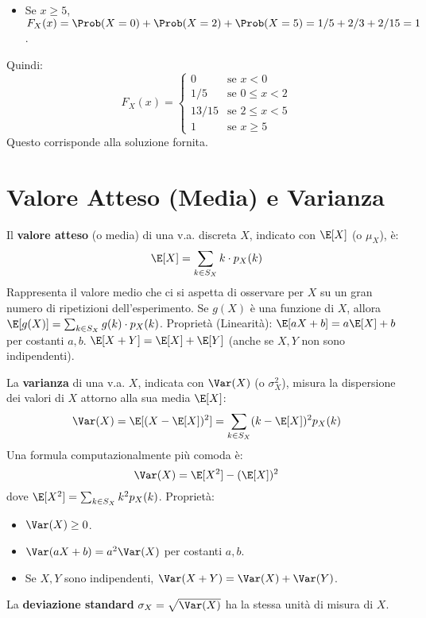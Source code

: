 \begin{example}
\begin{enumerate}
\begin{itemize}
        \item Se $x \ge 5$, $F_X(x) = \Prob(X=0) + \Prob(X=2) + \Prob(X=5) = 1/5 + 2/3 + 2/15 = 1$.
    \end{itemize}
    Quindi:
    \[ F_X(x) = \begin{cases} 0 & \text{se } x < 0 \\ 1/5 & \text{se } 0 \le x < 2 \\ 13/15 & \text{se } 2 \le x < 5 \\ 1 & \text{se } x \ge 5 \end{cases} \]
    Questo corrisponde alla soluzione fornita.
\end{enumerate}
\end{example}

\section{Valore Atteso (Media) e Varianza}
\begin{definition}
Il \textbf{valore atteso} (o media) di una v.a. discreta $X$, indicato con $\E[X]$ (o $\mu_X$), è:
\[ \E[X] = \sum_{k \in S_X} k \cdot p_X(k) \]
Rappresenta il valore medio che ci si aspetta di osservare per $X$ su un gran numero di ripetizioni dell'esperimento.
Se $g(X)$ è una funzione di $X$, allora $\E[g(X)] = \sum_{k \in S_X} g(k) \cdot p_X(k)$.
Proprietà (Linearità): $\E[aX+b] = a\E[X]+b$ per costanti $a,b$.
$\E[X+Y] = \E[X]+\E[Y]$ (anche se $X,Y$ non sono indipendenti).
\end{definition}

\begin{definition}[Varianza]
La \textbf{varianza} di una v.a. $X$, indicata con $\Var(X)$ (o $\sigma_X^2$), misura la dispersione dei valori di $X$ attorno alla sua media $\E[X]$:
\[ \Var(X) = \E[(X - \E[X])^2] = \sum_{k \in S_X} (k - \E[X])^2 p_X(k) \]
Una formula computazionalmente più comoda è:
\[ \Var(X) = \E[X^2] - (\E[X])^2 \]
dove $\E[X^2] = \sum_{k \in S_X} k^2 p_X(k)$.
Proprietà:
\begin{itemize}
    \item $\Var(X) \ge 0$.
    \item $\Var(aX+b) = a^2 \Var(X)$ per costanti $a,b$.
    \item Se $X, Y$ sono indipendenti, $\Var(X+Y) = \Var(X) + \Var(Y)$.
\end{itemize}
La \textbf{deviazione standard} $\sigma_X = \sqrt{\Var(X)}$ ha la stessa unità di misura di $X$.
\end{definition}

